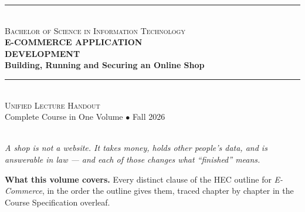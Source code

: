 \thispagestyle{empty}

\begin{center}
\vspace*{1.0cm}

{\color{secondary}\rule{0.85\textwidth}{2pt}}\\[6pt]
{\large\textsc{\color{secondary}Bachelor of Science in Information Technology}}\\[18pt]

{\Huge\bfseries\color{primary}E-COMMERCE APPLICATION\\[4pt]DEVELOPMENT}\\[10pt]
{\LARGE\bfseries\color{primary}Building, Running and Securing an Online Shop}\\[16pt]

{\color{secondary}\rule{0.85\textwidth}{2pt}}\\[16pt]

{\Large\textsc{Unified Lecture Handout}}\\[6pt]
{\large\color{gray!70!black}Complete Course in One Volume $\bullet$ Fall 2026}\\[24pt]

\\[10pt]
{\small\itshape\color{gray!70!black}A shop is not a website. It takes money,
holds other people's data, and is answerable in law --- and each of those
changes what ``finished'' means.}

\vspace{1.0cm}

\begin{tcolorbox}[enhanced, width=0.86\textwidth, colback=lightbg,
  colframe=primary, boxrule=0pt, leftrule=4pt, arc=2pt, top=6pt, bottom=6pt]
\small
\textbf{\color{primary}What this volume covers.} Every distinct clause of the
HEC outline for \emph{E-Commerce}, in the order the outline gives them, traced
chapter by chapter in the Course Specification overleaf.


\end{tcolorbox}
\end{center}
